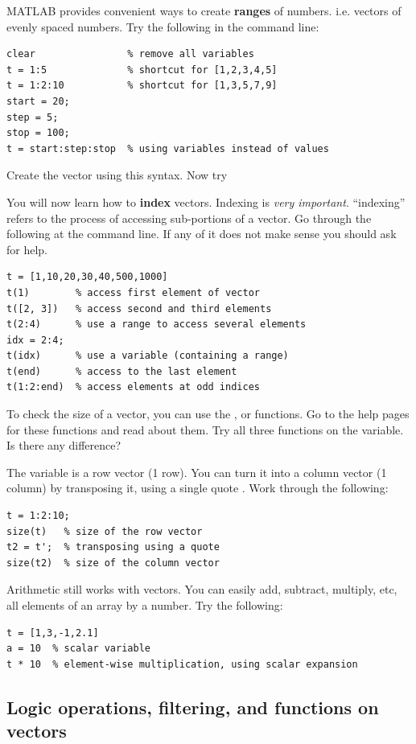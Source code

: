 \documentclass{article}
\begin{document}
MATLAB provides convenient ways to create \textbf{ranges} of numbers. i.e. vectors of evenly spaced numbers.
Try the following in the command line:
\begin{lstlisting}
clear                % remove all variables
t = 1:5              % shortcut for [1,2,3,4,5]
t = 1:2:10           % shortcut for [1,3,5,7,9]
start = 20;
step = 5;
stop = 100;
t = start:step:stop  % using variables instead of values
\end{lstlisting}
Create the vector \mcode{[5,8,11,14]} using this syntax. Now try \mcode{[-1,-2,-3,-4]}

You will now learn how to \textbf{index} vectors.
Indexing is \emph{very important}.
``indexing'' refers to the process of accessing sub-portions of a vector.
Go through the following at the command line.
If any of it does not make sense you should ask for help.
\begin{lstlisting}
t = [1,10,20,30,40,500,1000]
t(1)        % access first element of vector
t([2, 3])   % access second and third elements
t(2:4)      % use a range to access several elements
idx = 2:4;
t(idx)      % use a variable (containing a range)
t(end)      % access to the last element
t(1:2:end)  % access elements at odd indices
\end{lstlisting}

To check the size of a vector, you can use the ,  or  functions.
Go to the help pages for these functions and read about them.
Try all three functions on the  variable. Is there any difference?

\pagebreak
The variable  is a row vector (1 row).
You can turn it into a column vector (1 column) by transposing it, using a single quote .
Work through the following:
\begin{lstlisting}
t = 1:2:10;
size(t)   % size of the row vector
t2 = t';  % transposing using a quote
size(t2)  % size of the column vector
\end{lstlisting}

Arithmetic still works with vectors.
You can easily add, subtract, multiply, etc, all elements of an array by a number.
Try the following:
\begin{lstlisting}
t = [1,3,-1,2.1]
a = 10  % scalar variable
t * 10  % element-wise multiplication, using scalar expansion
\end{lstlisting}


\subsection{Logic operations, filtering, and functions on vectors}
\end{document}
